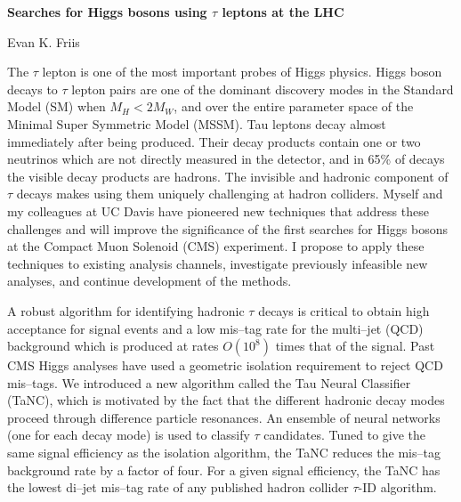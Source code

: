 \documentclass[a4paper,11pt,oneside]{amsart}
\begin{document}
\centerline{\Large \bf  Searches for Higgs bosons using $\tau$ leptons at the LHC} %
\centerline{Evan K. Friis}

 \medskip

The $\tau$ lepton is one of the most important probes of Higgs physics. 
Higgs boson decays to $\tau$ lepton pairs are one of the dominant discovery
modes in the Standard Model (SM) when $M_H < 2M_W$, and over the entire
parameter space of the Minimal Super Symmetric Model (MSSM).  Tau leptons decay
almost immediately after being produced.  Their decay products contain one or
two neutrinos which are not directly measured in the detector, and in 65\% of
decays the visible decay products are hadrons.  The invisible and hadronic
component of $\tau$ decays makes using them uniquely challenging at hadron
colliders.  Myself and my colleagues at UC Davis have pioneered new techniques
that address these challenges and will improve the significance of the first searches for
Higgs bosons at the Compact Muon Solenoid (CMS) experiment.  I propose to apply
these techniques to existing analysis channels, investigate previously
infeasible new analyses, and continue development of the methods.

A robust algorithm for identifying hadronic $\tau$ decays is critical to obtain
high acceptance for signal events and a low mis--tag rate for the multi--jet (QCD)
background which is produced at rates $O(10^8)$ times that of the signal.  Past
CMS Higgs analyses have used a geometric isolation requirement to reject QCD
mis--tags.  We introduced a new algorithm called the Tau Neural Classifier
(TaNC), which is motivated by the fact that the different hadronic decay modes
proceed through difference particle resonances.  An ensemble of neural networks
(one for each decay mode) is used to classify $\tau$ candidates.  Tuned to give
the same signal efficiency as the isolation algorithm, the TaNC reduces the
mis--tag background rate by a factor of four.  For a given signal efficiency,
the TaNC has the lowest di--jet mis--tag rate of any published hadron collider
$\tau$-ID algorithm.
\end{document}
